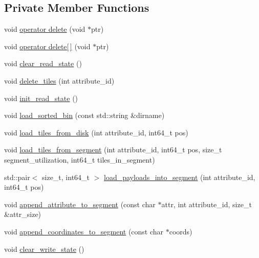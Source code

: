 \subsection*{Private Member Functions}
\begin{DoxyCompactItemize}
\item 
void \hyperlink{classStorageManager_1_1Fragment_a67e10e1748161a55d0c75b0b19a58dd7}{operator delete} (void $\ast$ptr)
\item 
void \hyperlink{classStorageManager_1_1Fragment_a65f0de60e42ac71a1b12be222c497f1c}{operator delete\mbox{[}$\,$\mbox{]}} (void $\ast$ptr)
\item 
void \hyperlink{classStorageManager_1_1Fragment_ab06065659ce3af9a4f1929df73079065}{clear\+\_\+read\+\_\+state} ()
\item 
void \hyperlink{classStorageManager_1_1Fragment_aae64ed0524836f04f8dcb4b5d8b209e7}{delete\+\_\+tiles} (int attribute\+\_\+id)
\item 
void \hyperlink{classStorageManager_1_1Fragment_ab0da2ac08f8dfbc96b293e58cbff0ef8}{init\+\_\+read\+\_\+state} ()
\item 
void \hyperlink{classStorageManager_1_1Fragment_ae64075a2c6dfd3b3c9c397dd418e3a9a}{load\+\_\+sorted\+\_\+bin} (const std\+::string \&dirname)
\item 
void \hyperlink{classStorageManager_1_1Fragment_a1de2c4f4eedc861cd970923c06d82b58}{load\+\_\+tiles\+\_\+from\+\_\+disk} (int attribute\+\_\+id, int64\+\_\+t pos)
\item 
void \hyperlink{classStorageManager_1_1Fragment_a99159a6ae39e50637e6d3568ff9be9e6}{load\+\_\+tiles\+\_\+from\+\_\+segment} (int attribute\+\_\+id, int64\+\_\+t pos, size\+\_\+t segment\+\_\+utilization, int64\+\_\+t tiles\+\_\+in\+\_\+segment)
\item 
std\+::pair$<$ size\+\_\+t, int64\+\_\+t $>$ \hyperlink{classStorageManager_1_1Fragment_a1ba7c45a9ffbb5989b96d10cf6dc256d}{load\+\_\+payloads\+\_\+into\+\_\+segment} (int attribute\+\_\+id, int64\+\_\+t pos)
\item 
void \hyperlink{classStorageManager_1_1Fragment_a3d6d9eb7854658f88dbc09f5455433d7}{append\+\_\+attribute\+\_\+to\+\_\+segment} (const char $\ast$attr, int attribute\+\_\+id, size\+\_\+t \&attr\+\_\+size)
\item 
void \hyperlink{classStorageManager_1_1Fragment_af50b4d47ac08eca95adb05e010290874}{append\+\_\+coordinates\+\_\+to\+\_\+segment} (const char $\ast$coords)
\item 
void \hyperlink{classStorageManager_1_1Fragment_a87fe4b3e77c03a9665265f0e2a8468b8}{clear\+\_\+write\+\_\+state} ()

\end{DoxyCompactItemize}

